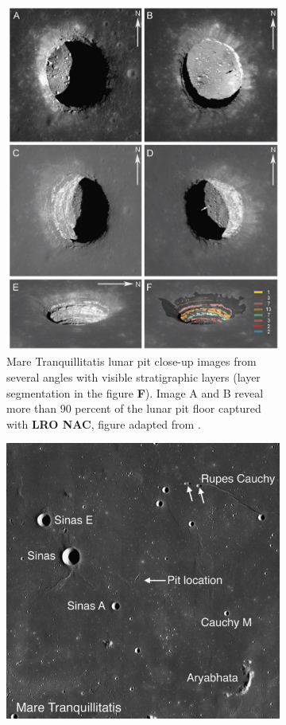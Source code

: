 \begin{figure}[h!]
    \centering
    \begin{subfigure}[c]{0.59\linewidth}
        \centering
        \includegraphics[width=0.9\linewidth]{lunar-pits-with-layers.png}
        \caption{Mare Tranquillitatis lunar pit close-up images from several angles with visible stratigraphic layers (layer segmentation in the figure \textbf{F}). Image A and B reveal more than 90 percent of the lunar pit floor captured with \textbf{LRO NAC}, figure adapted from \cite{sublunear-lava}. }
        \label{fig:image1}
    \end{subfigure}
    \hfill
    \begin{subfigure}[c]{0.4\linewidth}
        \centering
        \includegraphics[width=0.9\linewidth]{Lunar_Pit_layers_2pic_location.png}

\end{subfigure}
\end{figure}
